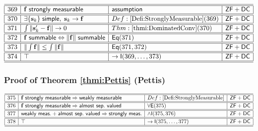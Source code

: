 \documentclass[11pt,reqno]{amsart}
\begin{document}
\noindent$%
\begin{array}{|r|l|l|l|}
\hline\hline
369 & \mathbf{f}\;\mathsf{strongly\ measurable} & \mathsf{assumption} & \mathsf{ZF+DC} \\ \hline\hline
370 & \exists\{\mathbf{s}_{k}\}\;\mathsf{simple},\;\mathbf{s}_{k}\to\mathbf{f} & Def:\ref{Defi:StronglyMeasurable}(369) & \mathsf{ZF+DC} \\ \hline\hline
371 & \int\|\mathbf{s}_{k}^{\prime}-\mathbf{f}\|\to0 & Thm:\ref{thmi:DominatedConv}(370) & \mathsf{ZF+DC} \\ \hline\hline
372 & \mathbf{f}\;\mathsf{summable}\Leftrightarrow\|\mathbf{f}\|\;\mathsf{summable} & \mathsf{Eq}(371) & \mathsf{ZF+DC} \\ \hline\hline
373 & \|\int\mathbf{f}\|\le\int\|\mathbf{f}\| & \mathsf{Eq}(371,372) & \mathsf{ZF+DC} \\ \hline\hline
374 & \top & \to\mathsf{I}(369,\dots,373) & \mathsf{ZF+DC} \\ \hline\hline
\end{array}%
$

\medskip

\subsubsection*{Proof of Theorem \ref{thmi:Pettis} (\textsf{Pettis})}

\noindent$%
\begin{array}{|r|l|l|l|}
\hline\hline
375 & \mathbf{f}\;\mathsf{strongly\ measurable}\Rightarrow\mathsf{weakly\ measurable} & Def:\ref{Defi:StronglyMeasurable} & \mathsf{ZF+DC} \\ \hline\hline
376 & \mathbf{f}\;\mathsf{strongly\ measurable}\Rightarrow\mathsf{almost\ sep.\ valued} & \forall\mathsf{E}(375) & \mathsf{ZF+DC} \\ \hline\hline
377 & \mathsf{weakly\ meas.}+\mathsf{almost\ sep.\ valued}\Rightarrow\mathsf{strongly\ meas.} & \land\mathsf{I}(375,376) & \mathsf{ZF+DC} \\ \hline\hline
378 & \top & \to\mathsf{I}(375,\dots,377) & \mathsf{ZF+DC} \\ \hline\hline
\end{array}%
$

\medskip


\end{document}
